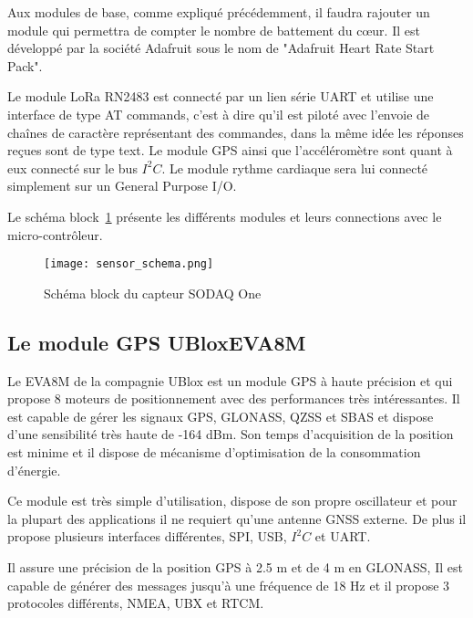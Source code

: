 Aux modules de base, comme expliqué précédemment, il faudra rajouter un module qui permettra de compter le nombre de battement du cœur. Il est développé par la société Adafruit sous le nom de "Adafruit Heart Rate Start Pack".


Le module LoRa RN2483 est connecté par un lien série UART et utilise une interface de type AT commands, c'est à dire qu'il est piloté avec l'envoie de chaînes de caractère représentant des commandes, dans la même idée les réponses reçues sont de type text. Le module GPS ainsi que l'accéléromètre sont quant à eux connecté sur le bus $I^{2}C$. Le module rythme cardiaque sera lui connecté simplement sur un General Purpose I/O.

Le schéma block~\ref{fig:schema_block_sodaq} présente les différents modules et leurs connections avec le micro-contrôleur.


\begin{figure}[htb]
\centering 
\texttt{[image: sensor\_schema.png]} 
\caption{Schéma block du capteur SODAQ One}
\label{fig:schema_block_sodaq}
\end{figure}

\subsection{Le module GPS UBloxEVA8M}\label{ch:module_ubloxeva8m}


Le EVA8M de la compagnie UBlox est un module GPS à haute précision et qui propose 8 moteurs de positionnement avec des performances très intéressantes. Il est capable de gérer les signaux GPS, GLONASS, QZSS et SBAS et dispose d'une sensibilité très haute de -164 dBm. Son temps d'acquisition de la position est minime et il dispose de mécanisme d'optimisation de la consommation d'énergie.

Ce module est très simple d'utilisation, dispose de son propre oscillateur et pour la plupart des applications il ne requiert qu'une antenne GNSS externe. De plus il propose plusieurs interfaces différentes, SPI, USB, $I^{2}C$ et UART.

Il assure une précision de la position GPS à 2.5 m et de 4 m en GLONASS, Il est capable de générer des messages jusqu'à une fréquence de 18 Hz et il propose 3 protocoles différents, NMEA, UBX et RTCM.

